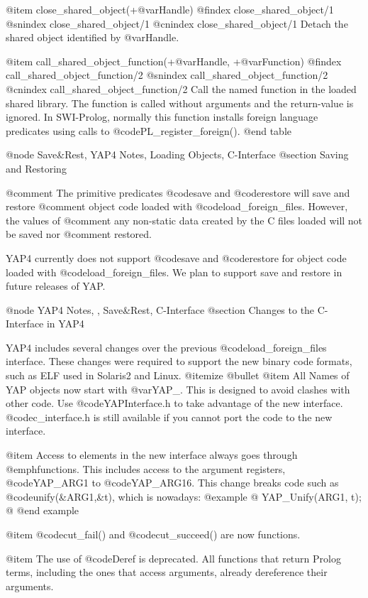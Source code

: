 {{{{{{{{{@item close_shared_object(+@var{Handle})
@findex close_shared_object/1
@snindex close_shared_object/1
@cnindex close_shared_object/1
    Detach the shared object identified by @var{Handle}. 

@item call_shared_object_function(+@var{Handle}, +@var{Function})
@findex call_shared_object_function/2
@snindex call_shared_object_function/2
@cnindex call_shared_object_function/2
    Call the named function in the loaded shared library. The function
    is called without arguments and the return-value is
    ignored. In SWI-Prolog, normally this function installs foreign
    language predicates using calls to @code{PL_register_foreign()}.
@end table

@node Save&Rest, YAP4 Notes, Loading Objects, C-Interface
@section Saving and Restoring

@comment The primitive predicates @code{save} and @code{restore} will save and restore
@comment object code loaded with @code{load_foreign_files}. However, the values of
@comment any non-static data created by the C files loaded will not be saved nor
@comment restored.

YAP4 currently does not support @code{save} and @code{restore} for object code
loaded with @code{load_foreign_files}. We plan to support save and restore
in future releases of YAP.

@node YAP4 Notes, , Save&Rest, C-Interface
@section Changes to the C-Interface in YAP4

YAP4 includes several changes over the previous @code{load_foreign_files}
interface. These changes were required to support the new binary code
formats, such as ELF used in Solaris2 and Linux.
@itemize @bullet
@item All Names of YAP objects now start with @var{YAP_}. This is
designed to avoid clashes with other code. Use @code{YAPInterface.h} to
take advantage of the new interface. @code{c_interface.h} is still
available if you cannot port the code to the new interface.

@item Access to elements in the new interface always goes through
@emph{functions}. This includes access to the argument registers,
@code{YAP_ARG1} to @code{YAP_ARG16}. This change breaks code such as
@code{unify(&ARG1,&t)}, which is nowadays:
@example
@{
   YAP_Unify(ARG1, t);
@}
@end example

@item @code{cut_fail()} and @code{cut_succeed()} are now functions.

@item The use of @code{Deref} is deprecated. All functions that return
Prolog terms, including the ones that access arguments, already
dereference their arguments.

}}}}}}}}}
